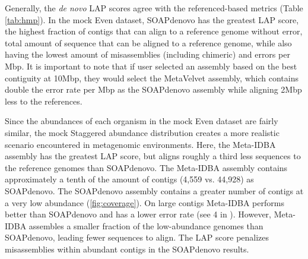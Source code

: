 Generally, the \emph{de novo} LAP scores agree with the referenced-based metrics (Table \ref{tab:hmp}).
In the mock Even dataset, SOAPdenovo has the greatest LAP score, the highest fraction of contigs that can align to a reference genome without error, total amount of sequence that can be aligned to a reference genome, while also having the lowest amount of misassemblies (including chimeric) and errors per Mbp.
It is important to note that if user selected an assembly based on the best contiguity at 10Mbp, they would select the MetaVelvet assembly, which contains double the error rate per Mbp as the SOAPdenovo assembly while aligning 2Mbp less to the references.

Since the abundances of each organism in the mock Even dataset are fairly similar, the mock Staggered abundance distribution creates a more realistic scenario encountered in metagenomic environments.
Here, the Meta-IDBA assembly has the greatest LAP score, but aligns roughly a third less sequences to the reference genomes than SOAPdenovo.
The Meta-IDBA assembly contains approximately a tenth of the amount of contigs (4,559 vs. 44,928) as SOAPdenovo.
The SOAPdenovo assembly contains a greater number of contigs at a very low abundance (\figurename \ref{fig:coverage}).
On large contigs Meta-IDBA performs better than SOAPdenovo and has a lower error rate (see \figurename 4 in \cite{treangen2013metamos}).
However, Meta-IDBA assembles a smaller fraction of the low-abundance genomes than SOAPdenovo, leading fewer sequences to align.
The LAP score penalizes misassemblies within abundant contigs in the SOAPdenovo results.




